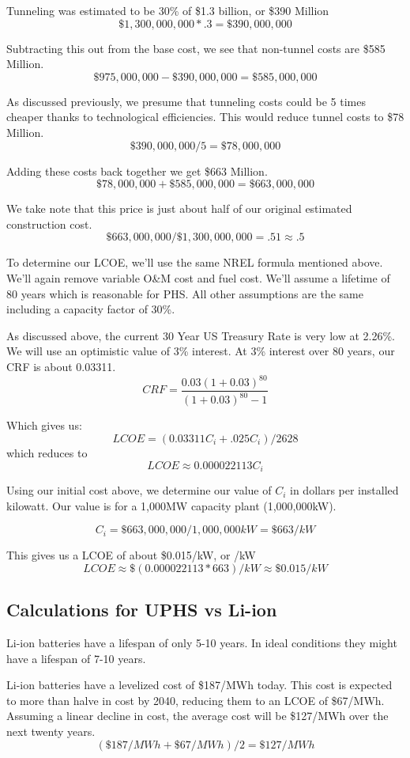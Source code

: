 Tunneling was estimated to be 30\% of \$1.3 billion, or \$390 Million
\[ \$1,300,000,000 * .3 = \$390,000,000\]

Subtracting this out from the base cost, we see that non-tunnel costs are \$585 Million.
\[ \$975,000,000 - \$390,000,000 = \$585,000,000\]

As discussed previously, we presume that tunneling costs could be 5 times cheaper thanks to technological efficiencies. This would reduce tunnel costs to \$78 Million.
\[ \$390,000,000 / 5 = \$78,000,000\]

Adding these costs back together we get \$663 Million.
\[ \$78,000,000 + \$585,000,000 = \$663,000,000 \]

We take note that this price is just about half of our original estimated construction cost.
\[  \$663,000,000  / \$1,300,000,000 = .51 \approx .5 \]

To determine our LCOE, we'll use the same NREL formula mentioned above. We'll again remove variable O\&M cost and fuel cost. We'll assume a lifetime of 80 years which is reasonable for PHS. All other assumptions are the same including a capacity factor of 30\%.

As discussed above, the current 30 Year US Treasury Rate is very low at 2.26\%. We will use an optimistic value of 3\% interest. At 3\% interest over 80 years, our CRF is about 0.03311.
\[ \displaystyle CRF={\frac {0.03(1+0.03)^{80}}{(1+0.03)^{80}-1}} \]

Which gives us:
\[ LCOE = (0.03311C_i + .025C_i) / 2628 \]
which reduces to
\[ LCOE \approx 0.000022113 C_i \]

Using our initial cost above, we determine our value of $C_i$ in dollars per installed kilowatt. Our value is for a 1,000MW capacity plant (1,000,000kW).

\[ C_i = \$663,000,000 / 1,000,000kW = \$663/kW\]

This gives us a LCOE of about \$0.015/kW, or /kW
\[ LCOE \approx \$(0.000022113 * 663)/kW \approx \$0.015/kW \]

\subsection{Calculations for UPHS vs Li-ion}
Li-ion batteries have a lifespan of only 5-10 years. \cite{The3BillionPlanToTurnHooverDamIntoAGiantBattery} In ideal conditions they might have a lifespan of 7-10 years. \cite{LifePredictionModelForLiIonBattery}

Li-ion batteries have a levelized cost of \$187/MWh today. This cost is expected to more than halve in cost by 2040, reducing them to an LCOE of \$67/MWh. Assuming a linear decline in cost, the average cost will be \$127/MWh over the next twenty years.
\[ (\$187/MWh + \$67/MWh) / 2 =  \$127/MWh \]

